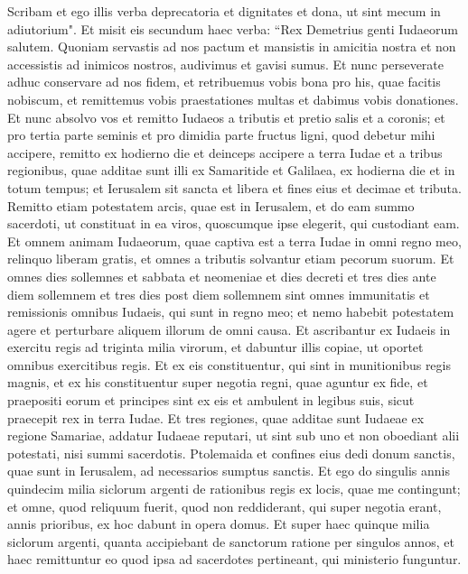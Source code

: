 \begin{biblechapter}
\verse Scribam et ego illis verba deprecatoria et dignitates et dona, ut sint mecum in adiutorium". 
\verse Et misit eis secundum haec verba: “Rex Demetrius genti Iudaeorum salutem. 
\verse Quoniam servastis ad nos pactum et mansistis in amicitia nostra et non accessistis ad inimicos nostros, audivimus et gavisi sumus. 
\verse Et nunc perseverate adhuc conservare ad nos fidem, et retribuemus vobis bona pro his, quae facitis nobiscum, 
\verse et remittemus vobis praestationes multas et dabimus vobis donationes. 
\verse Et nunc absolvo vos et remitto Iudaeos a tributis et pretio salis et a coronis;  
\verse et pro tertia parte seminis et pro dimidia parte fructus ligni, quod debetur mihi accipere, remitto ex hodierno die et deinceps accipere a terra Iudae et a tribus regionibus, quae additae sunt illi ex Samaritide et Galilaea, ex hodierna die et in totum tempus; 
\verse et Ierusalem sit sancta et libera et fines eius et decimae et tributa.  
\verse Remitto etiam potestatem arcis, quae est in Ierusalem, et do eam summo sacerdoti, ut constituat in ea viros, quoscumque ipse elegerit, qui custodiant eam. 
\verse Et omnem animam Iudaeorum, quae captiva est a terra Iudae in omni regno meo, relinquo liberam gratis, et omnes a tributis solvantur etiam pecorum suorum. 
\verse Et omnes dies sollemnes et sabbata et neomeniae et dies decreti et tres dies ante diem sollemnem et tres dies post diem sollemnem sint omnes immunitatis et remissionis omnibus Iudaeis, qui sunt in regno meo; 
\verse et nemo habebit potestatem agere et perturbare aliquem illorum de omni causa.  
\verse Et ascribantur ex Iudaeis in exercitu regis ad triginta milia virorum, et dabuntur illis copiae, ut oportet omnibus exercitibus regis. 
\verse Et ex eis constituentur, qui sint in munitionibus regis magnis, et ex his constituentur super negotia regni, quae aguntur ex fide, et praepositi eorum et principes sint ex eis et ambulent in legibus suis, sicut praecepit rex in terra Iudae. 
\verse Et tres regiones, quae additae sunt Iudaeae ex regione Samariae, addatur Iudaeae reputari, ut sint sub uno et non oboediant alii potestati, nisi summi sacerdotis. 
\verse Ptolemaida et confines eius dedi donum sanctis, quae sunt in Ierusalem, ad necessarios sumptus sanctis. 
\verse Et ego do singulis annis quindecim milia siclorum argenti de rationibus regis ex locis, quae me contingunt; 
\verse et omne, quod reliquum fuerit, quod non reddiderant, qui super negotia erant, annis prioribus, ex hoc dabunt in opera domus. 
\verse Et super haec quinque milia siclorum argenti, quanta accipiebant de sanctorum ratione per singulos annos, et haec remittuntur eo quod ipsa ad sacerdotes pertineant, qui ministerio funguntur. 

\end{biblechapter}
